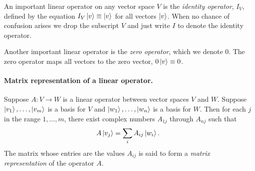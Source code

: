 An important linear operator on any vector space $V$ is the \emph{identity
operator}, $I_V$, defined by the equation $I_V\ket{v} \equiv \ket{v}$ for all
vectors $\ket{v}$. When no chance of confusion arises we drop the subscript $V$
and just write $I$ to denote the identity operator.

Another important linear operator is the \emph{zero operator}, which we denote
0. The zero operator maps all vectors to the zero vector, $0\ket{v} \equiv 0$.

\paragraph{Matrix representation of a linear operator.} Suppose $A : V
\rightarrow W$ is a linear operator between vector spaces $V$ and $W$. Suppose
$\ket{v_1}, \ldots, \ket{v_m}$ is a basis for $V$ and $\ket{w_1}, \ldots,
\ket{w_n}$ is a basis for $W$. Then for each $j$ in the range $1, \ldots, m$,
there exist complex numbers $A_{1j}$ through $A_{nj}$ such that
\begin{equation}
  A\ket{v_j} = \sum_i A_{ij}\ket{w_i}.
\end{equation} The matrix whose entries are the values $A_{ij}$ is said to form
a \emph{matrix representation} of the operator $A$.

